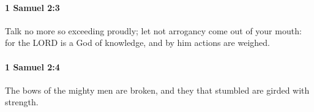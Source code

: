 		\paragraph{1 Samuel 2:3} %
			\label{1SAMUEL-2-3}

			Talk no more so exceeding proudly; let not arrogancy come out of your mouth: for the LORD is a God of knowledge, and by him actions are weighed.


		\paragraph{1 Samuel 2:4} %
			\label{1SAMUEL-2-4}

			The bows of the mighty men are broken, and they that stumbled are girded with strength.


